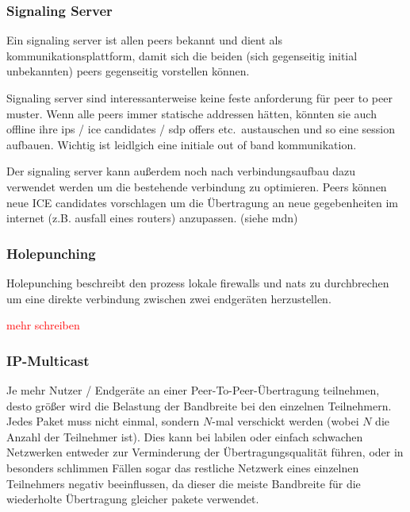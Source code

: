 \documentclass{article}
\begin{document}
\begin{onecolumn}
\subsubsection{Signaling Server}
Ein signaling server ist allen peers bekannt und dient als
kommunikationsplattform, damit sich die beiden (sich gegenseitig initial
unbekannten) peers gegenseitig vorstellen können.

Signaling server sind interessanterweise keine feste anforderung für peer to
peer muster. Wenn alle peers immer statische addressen hätten, könnten sie auch
offline ihre ips / ice candidates / sdp offers etc.\ austauschen und so eine
session aufbauen. Wichtig ist leidlgich eine initiale out of band
kommunikation.

Der signaling server kann außerdem noch nach verbindungsaufbau dazu verwendet
werden um die bestehende verbindung zu optimieren. Peers können neue ICE
candidates vorschlagen um die Übertragung an neue gegebenheiten im internet
(z.B. ausfall eines routers) anzupassen. (siehe mdn)


\subsubsection{Holepunching}
Holepunching beschreibt den prozess lokale firewalls und nats zu durchbrechen
um eine direkte verbindung zwischen zwei endgeräten herzustellen.

\textcolor{red}{mehr schreiben}


\subsubsection{IP-Multicast}

Je mehr Nutzer / Endgeräte an einer Peer-To-Peer-Übertragung teilnehmen, desto
größer wird die Belastung der Bandbreite bei den einzelnen Teilnehmern. Jedes
Paket muss nicht einmal, sondern $N$-mal verschickt werden (wobei $N$ die
Anzahl der Teilnehmer ist). Dies kann bei labilen oder einfach schwachen
Netzwerken entweder zur Verminderung der Übertragungsqualität führen, oder in
besonders schlimmen Fällen sogar das restliche Netzwerk eines einzelnen
Teilnehmers negativ beeinflussen, da dieser die meiste Bandbreite für die
wiederholte Übertragung gleicher pakete verwendet.


\end{onecolumn}
\end{document}
